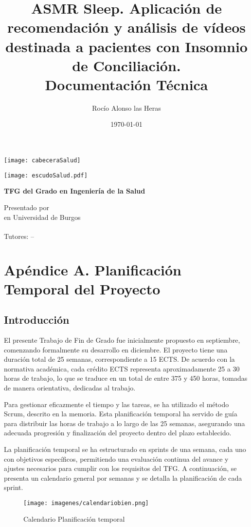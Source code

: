 \documentclass[a4paper,12pt,twoside]{memoir}
\title{ASMR Sleep. Aplicación de recomendación y análisis de vídeos destinada a pacientes con Insomnio de Conciliación. \\Documentación Técnica}
\author{Rocío Alonso las Heras}
\date{\today}
\makeatletter
\newcommand{\apendice}[1]{
	\chapter{#1}
}
\def\maketitle{
  \null
  \thispagestyle{empty}
\begin{center}
  \noindent\texttt{[image: cabeceraSalud]}\vspace{1.5cm}%
\end{center}
  
  \begin{center}
    \begin{minipage}[c][1.5cm][c]{.20\textwidth}
        \texttt{[image: escudoSalud.pdf]}
    \end{minipage}
  \end{center}
  
  \begin{center}
    \colorbox{cpardoBox}{%
        \begin{minipage}{.8\textwidth}
          \vspace{.5cm}\Large
          \begin{center}
          \textbf{TFG del Grado en Ingeniería de la Salud}\vspace{.6cm}\\
          \textbf{\LARGE\@title{}}
          \end{center}
          \vspace{.2cm}
        \end{minipage}
    }%
  \end{center}
  
  \begin{center}%
  {%
    \noindent\LARGE
    Presentado por \@author{}\\ 
    en Universidad de Burgos\\
    \vspace{0.5cm}
    \noindent\Large
    \@date{}\\
    \vspace{0.5cm}
    Tutores: \@tutor{} -- \@tutorb{}\\
  }%
  \end{center}%
  \null
  \cleardoublepage
  }
\makeatother
\begin{document}
\maketitle



\cleardoublepage






\frontmatter


\clearpage

\tableofcontents

\clearpage

\listoffigures

\clearpage

\listoftables

\clearpage

\mainmatter

\appendix
\apendice{Apéndice A. Planificación Temporal del Proyecto}
\section{Introducción}
El presente Trabajo de Fin de Grado fue inicialmente propuesto en septiembre, comenzando formalmente su desarrollo en diciembre. El proyecto tiene una duración total de 25 semanas, correspondiente a 15 ECTS. De acuerdo con la normativa académica, cada crédito ECTS representa aproximadamente 25 a 30 horas de trabajo, lo que se traduce en un total de entre 375 y 450 horas, tomadas de manera orientativa, dedicadas al trabajo.

Para gestionar eficazmente el tiempo y las tareas, se ha utilizado el método Scrum, descrito en la memoria. Esta planificación temporal ha servido de guía para distribuir las horas de trabajo a lo largo de las 25 semanas, asegurando una adecuada progresión y finalización del proyecto dentro del plazo establecido.

La planificación temporal se ha estructurado en sprints de una semana, cada uno con objetivos específicos, permitiendo una evaluación continua del avance y ajustes necesarios para cumplir con los requisitos del TFG. A continuación, se presenta un calendario general por semanas y se detalla la planificación de cada sprint.

\begin{figure}
    \centering
    \texttt{[image: imagenes/calendariobien.png]}
    \caption{Calendario Planificación temporal}
    \label{fig:enter-label}
\end{figure}
\end{document}

